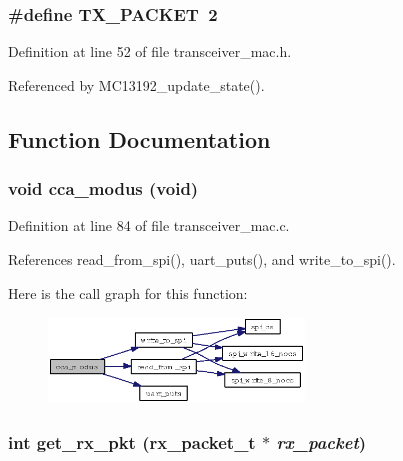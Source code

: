 \subsubsection{\setlength{\rightskip}{0pt plus 5cm}\#define TX\_\-PACKET~2}\label{group__ro__transceiver__mac_ga1072634687af8330af48ca3ef23c144}




Definition at line 52 of file transceiver\_\-mac.h.

Referenced by MC13192\_\-update\_\-state().

\subsection{Function Documentation}
\subsubsection{\setlength{\rightskip}{0pt plus 5cm}void cca\_\-modus (void)}\label{group__ro__transceiver__mac_g6d9695bac8eb630174f8254a42f5c526}




Definition at line 84 of file transceiver\_\-mac.c.

References read\_\-from\_\-spi(), uart\_\-puts(), and write\_\-to\_\-spi().

Here is the call graph for this function:\begin{figure}[H]
\begin{center}
\leavevmode
\includegraphics[width=193pt]{group__ro__transceiver__mac_g6d9695bac8eb630174f8254a42f5c526_cgraph}
\end{center}
\end{figure}
\subsubsection{\setlength{\rightskip}{0pt plus 5cm}int get\_\-rx\_\-pkt ({\bf rx\_\-packet\_\-t} $\ast$ {\em rx\_\-packet})}\label{group__ro__transceiver__mac_g067cd80bde03341e70769deee8aa8054}


